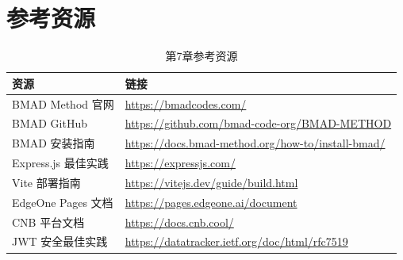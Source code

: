 \section{参考资源}

\begin{table}[H]
\centering
\begin{tabular}{ll}
\toprule
\textbf{资源} & \textbf{链接} \\
\midrule
BMAD Method 官网 & \url{https://bmadcodes.com/} \\
BMAD GitHub & \url{https://github.com/bmad-code-org/BMAD-METHOD} \\
BMAD 安装指南 & \url{https://docs.bmad-method.org/how-to/install-bmad/} \\
Express.js 最佳实践 & \url{https://expressjs.com/} \\
Vite 部署指南 & \url{https://vitejs.dev/guide/build.html} \\
EdgeOne Pages 文档 & \url{https://pages.edgeone.ai/document} \\
CNB 平台文档 & \url{https://docs.cnb.cool/} \\
JWT 安全最佳实践 & \url{https://datatracker.ietf.org/doc/html/rfc7519} \\
\bottomrule
\end{tabular}
\caption{第7章参考资源}
\end{table}